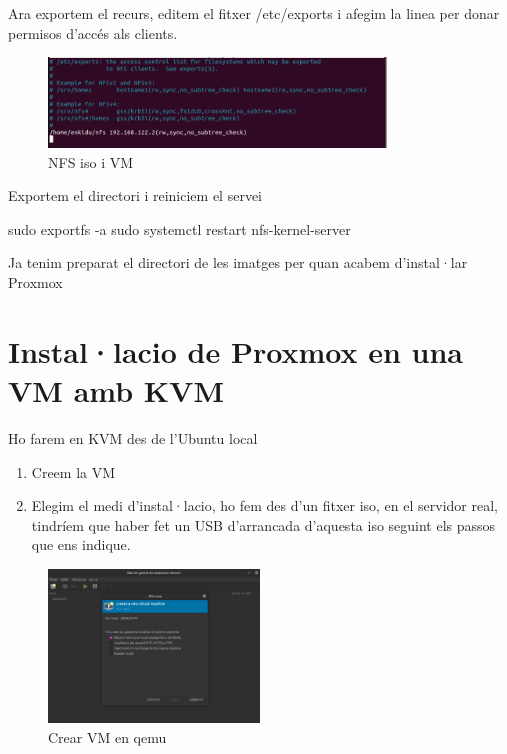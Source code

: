 \documentclass[
  10pt,
]{krantz}
\newenvironment{Shaded}{\begin{snugshade}}{\end{snugshade}}
\newcommand{\AttributeTok}[1]{\textcolor[rgb]{0.77,0.63,0.00}{#1}}
\newcommand{\FunctionTok}[1]{\textcolor[rgb]{0.00,0.00,0.00}{#1}}
\newcommand{\NormalTok}[1]{#1}
\providecommand{\tightlist}{%
  \setlength{\itemsep}{0pt}\setlength{\parskip}{0pt}}
\begin{document}
Ara exportem el recurs, editem el fitxer /etc/exports i afegim la linea per donar permisos d'accés als clients.

\begin{figure}
\centering
\includegraphics[width=0.8\textwidth,height=\textheight]{imatges/proxmox/nfs_imatges.png}
\caption{NFS iso i VM}
\end{figure}

Exportem el directori i reiniciem el servei

\begin{Shaded}
\begin{Highlighting}[]
\FunctionTok{sudo}\NormalTok{ exportfs }\AttributeTok{{-}a}
\FunctionTok{sudo}\NormalTok{ systemctl restart nfs{-}kernel{-}server}
\end{Highlighting}
\end{Shaded}

Ja tenim preparat el directori de les imatges per quan acabem d'instal·lar Proxmox

\hypertarget{installacio-de-proxmox-en-una-vm-amb-kvm}{%
\section{Instal·lacio de Proxmox en una VM amb KVM}\label{installacio-de-proxmox-en-una-vm-amb-kvm}}

Ho farem en KVM des de l'Ubuntu local

\begin{enumerate}
\def\labelenumi{\arabic{enumi}.}
\tightlist
\item
  Creem la VM
\item
  Elegim el medi d'instal·lacio, ho fem des d'un fitxer iso, en el servidor real, tindríem que haber fet un USB d'arrancada d'aquesta iso seguint els passos que ens indique.
\end{enumerate}

\begin{figure}
\centering
\includegraphics[width=0.5\textwidth,height=\textheight]{imatges/proxmox/proxmox_install1.png}
\caption{Crear VM en qemu}
\end{figure}
\end{document}

